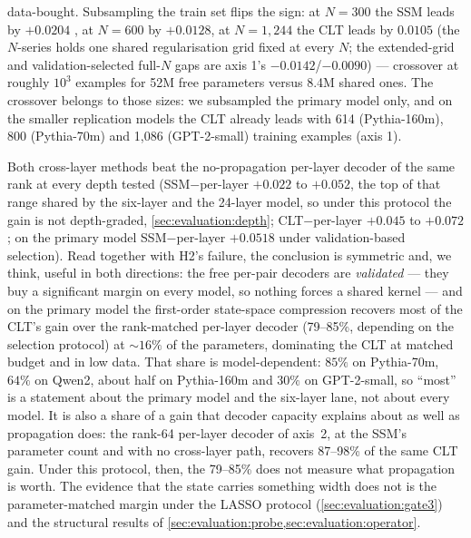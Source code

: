 \begin{enumerate}
{    data-bought.} Subsampling
    the train set flips the sign: at $N{=}300$ the SSM leads by $+0.0204$
    , at $N{=}600$ by $+0.0128$, at $N{=}1{,}244$
    the CLT leads by $0.0105$ (the $N$-series holds one shared regularisation
    grid fixed at every $N$; the extended-grid and validation-selected
    full-$N$ gaps are axis 1's $-0.0142$/$-0.0090$) --- crossover at roughly
    $10^3$ examples for
    52M free parameters versus 8.4M shared ones. The crossover belongs to
    those sizes: we subsampled the primary model only, and on the smaller
    replication models the CLT already leads with 614 (Pythia-160m), 800
    (Pythia-70m) and 1{,}086 (GPT-2-small) training examples (axis 1).
\end{enumerate}

Both cross-layer methods beat the no-propagation per-layer decoder of the
same rank at every depth tested (SSM$-$per-layer $+0.022$ to $+0.052$, the
top of that range shared by the six-layer and the 24-layer model, so under
this protocol the gain is not depth-graded, \cref{sec:evaluation:depth};
CLT$-$per-layer $+0.045$ to $+0.072$; on the primary model
SSM$-$per-layer $+0.0518$  under validation-based
selection). Read together
with H2's failure, the conclusion is symmetric and, we think, useful in both
directions: the free per-pair decoders are \emph{validated} --- they buy a
significant margin on every model, so nothing forces a shared kernel --- and
on the primary model the first-order state-space compression recovers most of
the CLT's gain over the rank-matched per-layer decoder (79--85\%, depending
on the selection protocol) at ${\sim}16\%$ of the parameters, dominating the
CLT at matched budget and in low data. That share is
model-dependent: $85\%$ on Pythia-70m, $64\%$ on Qwen2, about half on
Pythia-160m and $30\%$ on GPT-2-small, so ``most'' is a statement about the
primary model and the six-layer lane, not about every model. It is also a
share of a gain that decoder capacity explains about as well as propagation
does: the rank-64 per-layer decoder of axis~2, at the SSM's parameter count
and with no cross-layer path, recovers 87--98\% of the same CLT gain. Under
this protocol, then, the 79--85\% does not measure what propagation is
worth. The evidence that the state carries something width does not is the
parameter-matched margin under the LASSO protocol
(\cref{sec:evaluation:gate3}) and the structural results of
\cref{sec:evaluation:probe,sec:evaluation:operator}.

